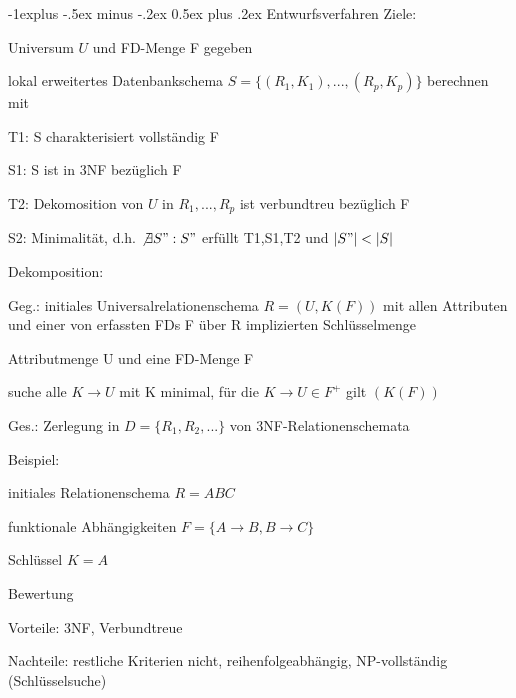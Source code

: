 \documentclass[a4paper]{article}
\makeatletter
\renewcommand{\subsection}{\@startsection{subsection}{2}{0mm}%
                                {-1explus -.5ex minus -.2ex}%
                                {0.5ex plus .2ex}%
                                {\normalfont\normalsize\bfseries}}
\makeatother
\begin{document}
\begin{multicols}{3}
\subsection{Entwurfsverfahren}
Ziele:
\begin{itemize*}
    \item Universum $U$ und FD-Menge F gegeben
    \item lokal erweitertes Datenbankschema $S=\{(R_1, K_1),...,(R_p, K_p)\}$ berechnen mit
    \begin{itemize*}
        \item T1: S charakterisiert vollständig F
        \item S1: S ist in 3NF bezüglich F
        \item T2: Dekomosition von $U$ in $R_1,...,R_p$ ist verbundtreu bezüglich F
        \item S2: Minimalität, d.h. $\not\exists S":S"$ erfüllt T1,S1,T2 und $|S"|<|S|$
    \end{itemize*}
\end{itemize*}

Dekomposition:
\begin{itemize*}
    \item Geg.: initiales Universalrelationenschema $R = (U, K(F))$ mit allen Attributen und einer von erfassten FDs F über R implizierten Schlüsselmenge
    \begin{itemize*}
        \item Attributmenge U und eine FD-Menge F
        \item suche alle $K\rightarrow U$ mit K minimal, für die $K\rightarrow U \in F^+$ gilt $(K(F))$
    \end{itemize*}
    \item Ges.: Zerlegung in $D = \{R_1, R_2,... \}$ von 3NF-Relationenschemata
    \item Beispiel:
    \begin{itemize*}
        \item initiales Relationenschema $R=ABC$
        \item funktionale Abhängigkeiten $F=\{A\rightarrow B, B\rightarrow C\}$
        \item Schlüssel $K=A$
    \end{itemize*}
    \item Bewertung
    \begin{itemize*}
        \item Vorteile: 3NF, Verbundtreue
        \item Nachteile: restliche Kriterien nicht, reihenfolgeabhängig, NP-vollständig (Schlüsselsuche)
    \end{itemize*}
\end{itemize*}


\end{multicols}
\end{document}
